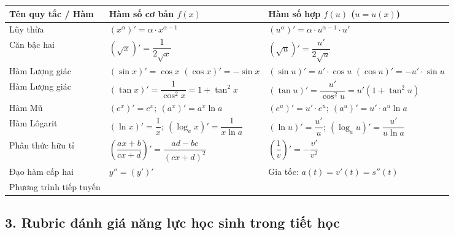 \documentclass[12pt, a4paper]{article}
\begin{document}
\begin{center}
\begin{tabularx}{\textwidth}{|>{\centering\arraybackslash}p{3.5cm}|>{\centering\arraybackslash}X|>{\centering\arraybackslash}X|}
\hline
\textbf{Tên quy tắc / Hàm} & \textbf{Hàm số cơ bản $f(x)$} & \textbf{Hàm số hợp $f(u)$ ($u = u(x)$)} \\
\hline
Lũy thừa & $(x^\alpha)' = \alpha \cdot x^{\alpha - 1}$ & $(u^\alpha)' = \alpha \cdot u^{\alpha - 1} \cdot u'$ \\
\hline
Căn bậc hai & $(\sqrt{x})' = \dfrac{1}{2\sqrt{x}}$ & $(\sqrt{u})' = \dfrac{u'}{2\sqrt{u}}$ \\
\hline
Hàm Lượng giác & $(\sin x)' = \cos x$ \newline $(\cos x)' = -\sin x$ & $(\sin u)' = u' \cdot \cos u$ \newline $(\cos u)' = -u' \cdot \sin u$ \\
\hline
Hàm Lượng giác & $(\tan x)' = \dfrac{1}{\cos^2 x} = 1 + \tan^2 x$ & $(\tan u)' = \dfrac{u'}{\cos^2 u} = u'(1 + \tan^2 u)$ \\
\hline
Hàm Mũ & $(e^x)' = e^x; \ (a^x)' = a^x \ln a$ & $(e^u)' = u' \cdot e^u; \ (a^u)' = u' \cdot a^u \ln a$ \\
\hline
Hàm Lôgarit & $(\ln x)' = \dfrac{1}{x}; \ (\log_a x)' = \dfrac{1}{x \ln a}$ & $(\ln u)' = \dfrac{u'}{u}; \ (\log_a u)' = \dfrac{u'}{u \ln a}$ \\
\hline
Phân thức hữu tỉ & $\left(\dfrac{ax + b}{cx + d}\right)' = \dfrac{ad - bc}{(cx + d)^2}$ & $\left(\dfrac{1}{v}\right)' = -\dfrac{v'}{v^2}$ \\
\hline
Đạo hàm cấp hai & $y'' = (y')'$ & Gia tốc: $a(t) = v'(t) = s''(t)$ \\
\hline
Phương trình tiếp tuyến & \multicolumn{2}{c|}{$y - y_0 = f'(x_0)(x - x_0) \iff y = f'(x_0)(x - x_0) + y_0$} \\
\hline
\end{tabularx}
\end{center}

\vspace{5pt}

\subsection*{3. Rubric đánh giá năng lực học sinh trong tiết học}
\end{document}
